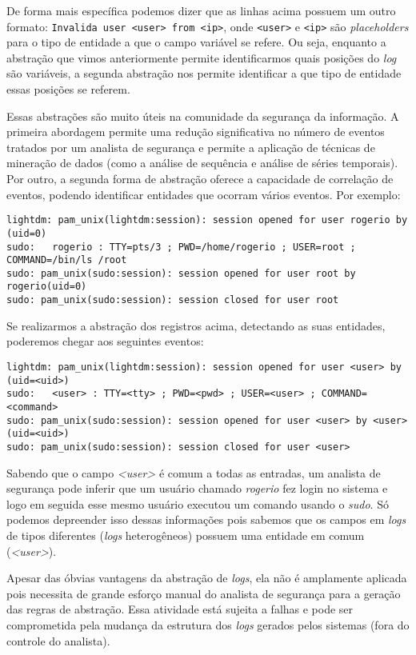 \documentclass[
	12pt,				%
	openright,			%
	twoside,			%
	a4paper,			%
	english,			%
	spanish,			%
	brazil,				%
	]{abntex2}
\begin{document}
De forma mais específica podemos dizer que as linhas acima possuem um outro formato: \verb|Invalida user <user> from <ip>|, onde \verb|<user>| e \verb|<ip>| são \emph{placeholders} para o tipo de entidade a que o campo variável se refere. Ou seja, enquanto a abstração que vimos anteriormente permite identificarmos quais posições do \emph{log} são variáveis, a segunda abstração nos permite identificar a que tipo de entidade essas posições se referem.

Essas abstrações são muito úteis na comunidade da segurança da informação. A primeira abordagem permite uma redução significativa no número de eventos tratados por um analista de segurança e permite a aplicação de técnicas de mineração de dados (como a análise de sequência e análise de séries temporais). Por outro, a segunda forma de abstração oferece a capacidade de correlação de eventos, podendo identificar entidades que ocorram vários eventos. Por exemplo:

{\small
\begin{verbatim}
lightdm: pam_unix(lightdm:session): session opened for user rogerio by (uid=0)
sudo:   rogerio : TTY=pts/3 ; PWD=/home/rogerio ; USER=root ; COMMAND=/bin/ls /root
sudo: pam_unix(sudo:session): session opened for user root by rogerio(uid=0)
sudo: pam_unix(sudo:session): session closed for user root
\end{verbatim}
}

Se realizarmos a abstração dos registros acima, detectando as suas entidades, poderemos chegar aos seguintes eventos:

{\small
\begin{verbatim}
lightdm: pam_unix(lightdm:session): session opened for user <user> by (uid=<uid>)
sudo:   <user> : TTY=<tty> ; PWD=<pwd> ; USER=<user> ; COMMAND=<command>
sudo: pam_unix(sudo:session): session opened for user <user> by <user>(uid=<uid>)
sudo: pam_unix(sudo:session): session closed for user <user>
\end{verbatim}
}

Sabendo que o campo \emph{<user>} é comum a todas as entradas, um analista de segurança pode inferir que um usuário chamado \emph{rogerio} fez login no sistema e logo em seguida esse mesmo usuário executou um comando usando o \emph{sudo}. Só podemos depreender isso dessas informações pois sabemos que os campos em \emph{logs} de tipos diferentes (\emph{logs} heterogêneos) possuem uma entidade em comum (\emph{<user>}).

Apesar das óbvias vantagens da abstração de \emph{logs}, ela não é amplamente aplicada pois necessita de grande esforço manual do analista de segurança para a geração das regras de abstração. Essa atividade está sujeita a falhas e pode ser comprometida pela mudança da estrutura dos \emph{logs} gerados pelos sistemas (fora do controle do analista).
\end{document}
